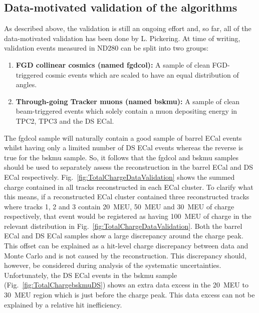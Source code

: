 \subsection{Data-motivated validation of the algorithms}
\label{subsec:DataMotivatedValidation}
As described above, the validation is still an ongoing effort and, so far, all of the data-motivated validation has been done by L. Pickering.  At time of writing, validation events  measured in ND280 can be split into two groups:
\begin{enumerate}
\item \textbf{FGD collinear cosmics (named fgdcol):} A sample of clean FGD-triggered cosmic events which are scaled to have an equal distribution of angles.
\item \textbf{Through-going Tracker muons (named bskmu):} A sample of clean beam-triggered events which solely contain a muon depositing energy in TPC2, TPC3 and the DS ECal.
\end{enumerate}
The fgdcol sample will naturally contain a good sample of barrel ECal events whilst having only a limited number of DS ECal events whereas the reverse is true for the bskmu sample.  So, it follows that the fgdcol and bskmu samples should be used to separately assess the reconstruction in the barrel ECal and DS ECal respectively. 
\newline
\newline
Fig.~\ref{fig:TotalChargeDataValidation} shows the summed charge contained in all tracks reconstructed in each ECal cluster.  To clarify what this means, if a reconstructed ECal cluster contained three reconstructed tracks where tracks 1, 2 and 3 contain 20~MEU, 50~MEU and 30~MEU of charge respectively, that event would be registered as having 100~MEU of charge in the relevant distribution in Fig.~\ref{fig:TotalChargeDataValidation}.  Both the barrel ECal and DS ECal samples show a large discrepancy around the charge peak.  This offset can be explained as a hit-level charge discrepancy between data and Monte Carlo and is not caused by the reconstruction.  This discrepancy should, however, be considered during analysis of the systematic uncertainties.  Unfortunately, the DS ECal events in the bskmu sample (Fig.~\ref{fig:TotalChargebskmuDS}) shows an extra data excess in the 20~MEU to 30~MEU region which is just before the charge peak.  This data excess can not be explained by a relative hit inefficiency. 
